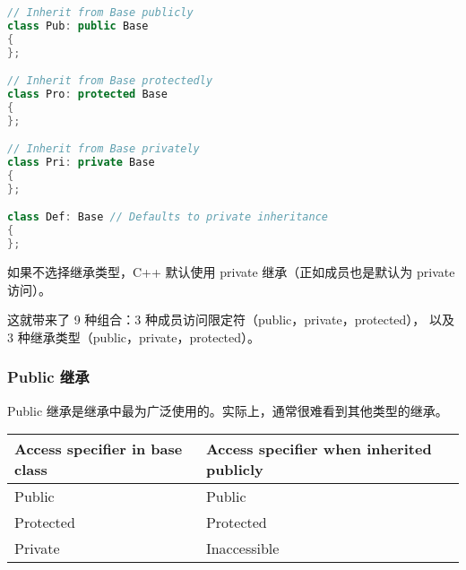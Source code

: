 \documentclass[../../LearnCpp.tex]{subfiles}
\begin{document}
\begin{lstlisting}[language=C++]
// Inherit from Base publicly
class Pub: public Base
{
};

// Inherit from Base protectedly
class Pro: protected Base
{
};

// Inherit from Base privately
class Pri: private Base
{
};

class Def: Base // Defaults to private inheritance
{
};
\end{lstlisting}

如果不选择继承类型，C++ 默认使用 private 继承（正如成员也是默认为 private 访问）。

这就带来了 9 种组合：3 种成员访问限定符（public，private，protected），
以及 3 种继承类型（public，private，protected）。

\subsubsection*{Public 继承}

Public 继承是继承中最为广泛使用的。实际上，通常很难看到其他类型的继承。

\begin{center}
    \begin{tiny}
        \begin{tabularx}{ 1\textwidth}{
                | >{\raggedright\arraybackslash}X
                | >{\raggedright\arraybackslash}X |
            }
            \hline
            Access specifier in base class & Access specifier when inherited publicly \\
            \hline
            Public                         & Public                                   \\
            Protected                      & Protected                                \\
            Private                        & Inaccessible                             \\
            \hline
        \end{tabularx}
    \end{tiny}
\end{center}
\end{document}
